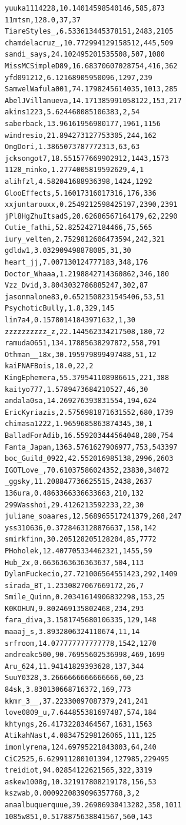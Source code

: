 \begin{verbatim}
yuuka1114228,10.14014598540146,585,873
11mtsm,128.0,37,37
TiareStyles_,6.533613445378151,2483,2105
chamdelacruz_,10.772994129158512,445,509
sandi_says,24.102495201535508,507,1080
MissMCSimpleD89,16.68370607028754,416,362
yfd091212,6.12168905950096,1297,239
SamwelWafula001,74.1798245614035,1013,285
AbelJVillanueva,14.171385991058122,153,217
akins1223,5.624468085106383,2,54
saberback,13.96161956980177,1961,1156
windresio,21.894273127753305,244,162
OngDori,1.3865073787772313,63,63
jcksongot7,18.551577669902912,1443,1573
1128_minko,1.2774005819592629,4,1
alihfzl,4.582041688936398,1424,1292
GlooEffects,5.16017316017316,176,336
xxjuntarouxx,0.2549212598425197,2390,2391
jPl8HgZhuItsadS,20.62686567164179,62,2290
Cutie_fathi,52.8252427184466,75,565
iury_velten,2.7529812606473594,242,321
gdldw1,3.032909498878085,31,30
heart_jj,7.007130124777183,348,176
Doctor_Whaaa,1.2198842714360862,346,180
Vzz_Dvid,3.8043032786885247,302,87
jasonmalone83,0.6521508231545406,53,51
PsychoticBully,1.8,329,145
lin7a4,0.15780141843971632,1,30
zzzzzzzzzz_z,22.144562334217508,180,72
ramuda0651,134.17885638297872,558,791
Othman__18x,30.195979899497488,51,12
kaiFNAFBois,18.0,22,2
KingEphemera,55.379541108986615,221,388
kaityo777,1.5789473684210527,46,30
andala0sa,14.269276393831554,194,624
EricKyriazis,2.5756981871631552,680,1739
chimasa1222,1.9659685863874345,30,1
BalladForAdib,16.559203444564048,280,754
Fanta_Japan,1363.5761627906977,753,543397
boc_Guild_0922,42.552016985138,2996,2603
IGOTLove_,70.61037586024352,23830,34072
_ggsky,11.208847736625515,2438,2637
136ura,0.4863366336633663,210,132
299Wasshoi,29.4126213592233,22,30
juliane_soaares,12.568965517241379,268,247
yss310636,0.3728463128876637,158,142
smirkfinn,30.205128205128204,85,7772
PHoholek,12.407705334462321,1455,59
Hub_2x,0.6636363636363637,504,113
DylanFuckecio,27.721006564551423,292,1409
sirada_BT,1.2330827067669172,26,7
Smile_Quinn,0.20341614906832298,153,25
K0KOHUN,9.802469135802468,234,293
fara_diva,3.1581745680106335,129,148
maaaj_s,3.8932806324110674,11,14
srfroom,14.077777777777778,1542,1270
andreakc500,90.76955602536998,469,1699
Aru_624,11.94141829393628,137,344
SuuY0328,3.2666666666666666,60,23
84sk,3.830130668716372,169,773
kkmr_3__,37.22330097087379,241,241
love0809_u,7.644855381697487,574,184
khtyngs,26.41732283464567,1631,1563
AtikahNast,4.083475298126065,111,125
imonlyrena,124.69795221843003,64,240
CiC2525,6.629911280101394,127985,229495
treidiot,94.02854122621565,322,3319
askew1008g,10.321917808219178,156,53
kszwab,0.0009220839096357768,3,2
anaalbuquerquue,39.26986930413282,358,1011
1085w851,0.5178875638841567,560,143

\end{verbatim}
